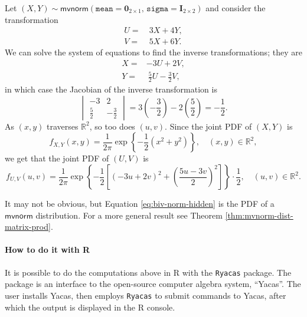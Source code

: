 \documentclass[captions=tableheading]{scrbook}
\begin{document}
\begin{example}
Let \((X,Y)\sim\mathsf{mvnorm}(\mathtt{mean}=\mathbf{0}_{2\times1},\,\mathtt{sigma}=\mathbf{I}_{2\times2})\) and consider the transformation
\begin{align*}
U= & \ 3X+4Y,\\
V= & \ 5X+6Y.
\end{align*}
We can solve the system of equations to find the inverse transformations; they are
\begin{align*}
X= & -3U+2V,\\
Y= & \ \frac{5}{2}U-\frac{3}{2}V,
\end{align*}
in which case the Jacobian of the inverse transformation is
\[
\begin{vmatrix}
-3 & 2\\
\frac{5}{2} & -\frac{3}{2}
\end{vmatrix}
= 3\left(-\frac{3}{2}\right)-2\left(\frac{5}{2}\right) = -\frac{1}{2}.
\]
As \((x,y)\) traverses \(\mathbb{R}^{2}\), so too does \((u,v)\). Since the joint PDF of \((X,Y)\) is
\[
f_{X,Y}(x,y)=\frac{1}{2\pi}\exp\left\{ -\frac{1}{2}\left(x^{2}+y^{2}\right)\right\} ,\quad(x,y)\in\mathbb{R}^{2},
\]
we get that the joint PDF of \((U,V)\) is
\begin{equation}
f_{U,V}(u,v)=\frac{1}{2\pi}\exp\left\{ -\frac{1}{2}\left[\left(-3u+2v\right)^{2}+\left(\frac{5u-3v}{2}\right)^{2}\right]\right\} \cdot\frac{1}{2},\quad(u,v)\in\mathbb{R}^{2}.\label{eq:biv-norm-hidden}
\end{equation}
\end{example}


\begin{rem}
It may not be obvious, but Equation \ref{eq:biv-norm-hidden} is the PDF of a \(\mathsf{mvnorm}\) distribution. For a more general result see Theorem \ref{thm:mvnorm-dist-matrix-prod}.
\end{rem}

\paragraph*{How to do it with \textsf{R}}
\label{sub:bivariate-transf-R}

It is possible to do the computations above in \textsf{R} with the \texttt{Ryacas} package. The package is an interface to the open-source computer algebra system, ``Yacas''. The user installs Yacas, then employs \texttt{Ryacas} to submit commands to Yacas, after which the output is displayed in the \textsf{R} console.
\end{document}

